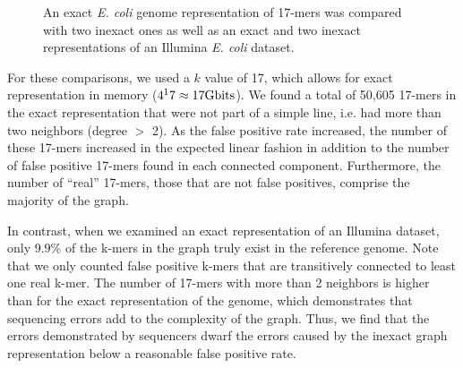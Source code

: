 \documentclass[12pt]{article} \usepackage{simplemargins}
\begin{document}
\begin{figure}
\caption{An exact \emph{E. coli} genome representation of 17-mers was compared with 
two inexact ones as well as an exact and two inexact representations of an Illumina 
\emph{E. coli} dataset.}
\end{figure}

For these comparisons, we used a $k$ value of 17, which allows for exact
representation in memory ($4^17 \approx 17 {\rm Gbits}$). We found 
a total of 50,605 17-mers in the exact representation that were not
part of a simple line, i.e. had more 
than two neighbors (degree $>$ 2). As the false positive rate 
increased, the number of these 
17-mers increased in the expected linear fashion in addition to the number of 
false positive 17-mers found in each connected component. Furthermore, the number of 
``real'' 17-mers, those that are not false positives, 
comprise the majority of the graph.

In contrast, when we examined an exact representation of an Illumina
dataset, only 9.9\% of the k-mers in the graph truly exist in the
reference genome. Note that we only counted false positive k-mers that
are transitively connected to least one real k-mer. The
number of 17-mers with more than 2 neighbors is higher
than for the exact representation of the genome, which demonstrates
that sequencing errors add to the complexity of the
graph. Thus, we find that the errors demonstrated by sequencers dwarf
the errors caused by the inexact graph representation below a
reasonable false positive rate.
\end{document}
